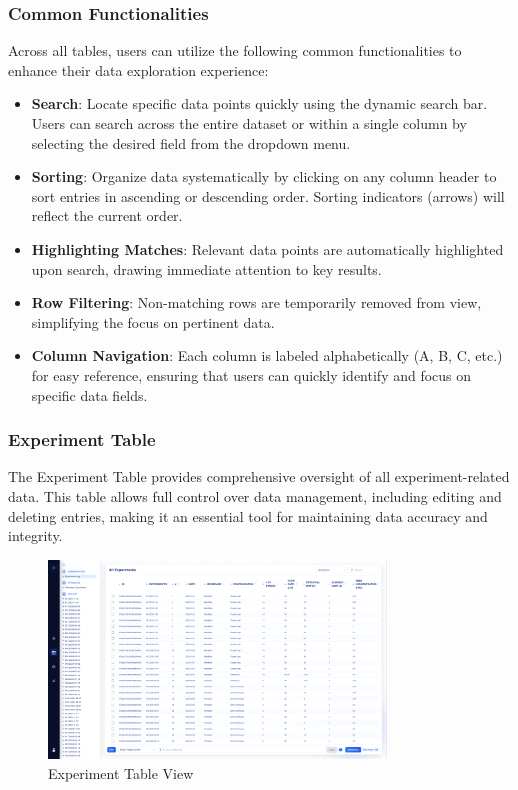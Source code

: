 \documentclass[12pt]{article}
\begin{document}
\subsubsection{Common Functionalities}
Across all tables, users can utilize the following common functionalities to
enhance their data exploration experience:
\begin{itemize}
    \item \textbf{Search}: Locate specific data points quickly using the dynamic
    search bar. Users can search across the entire dataset or within a single
    column by selecting the desired field from the dropdown menu.
    \item \textbf{Sorting}: Organize data systematically by clicking on any
    column header to sort entries in ascending or descending order. Sorting
    indicators (arrows) will reflect the current order.
    \item \textbf{Highlighting Matches}: Relevant data points are automatically
    highlighted upon search, drawing immediate attention to key results.
    \item \textbf{Row Filtering}: Non-matching rows are temporarily removed from
    view, simplifying the focus on pertinent data.
    \item \textbf{Column Navigation}: Each column is labeled alphabetically (A,
    B, C, etc.) for easy reference, ensuring that users can quickly identify and
    focus on specific data fields.
\end{itemize}

\subsubsection{Experiment Table}
The Experiment Table  provides comprehensive oversight of all experiment-related
data. This table allows full control over data management, including editing and
deleting entries, making it an essential tool for maintaining data accuracy and
integrity.

\begin{figure}[H]
    \centering
    \includegraphics[width=0.8\textwidth]{./Diagrams/ExperimentTableView.png}
    \caption{Experiment Table View}
\end{figure}
\end{document}
